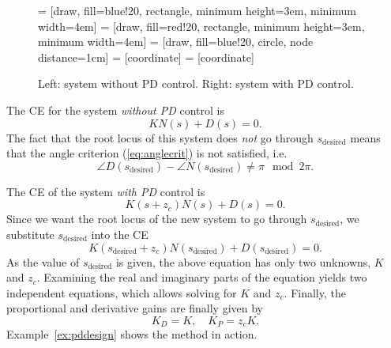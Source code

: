 \documentclass[a4paper,11pt]{report}
\theoremstyle{definition}
\newcommand{\des}{\textrm{desired}}
\begin{document}
\begin{figure}[H]
  \label{fig:pddesign}
  \centering
   = [draw, fill=blue!20, rectangle, minimum height=3em, minimum width=4em]
   = [draw, fill=red!20, rectangle, minimum height=3em, minimum width=4em]
   = [draw, fill=blue!20, circle, node distance=1cm]
   = [coordinate]
   = [coordinate]
  \hspace{0.5cm}
  \caption{Left: system without PD control. Right: system with PD control.}
\end{figure}

The CE for the system \emph{without PD} control is
\[
KN(s)+D(s) = 0.
\]
The fact that the root locus of this system does \emph{not} go through
$s_\des$ means that the angle criterion (\ref{eq:anglecrit}) is not
satisfied, i.e.
\[
\angle D(s_\des)-\angle N(s_\des) \neq \pi \mod 2\pi.
\]

The CE of the system \emph{with PD} control is
\[
K(s+z_c)N(s)+D(s) = 0.
\]
Since we want the root locus of the new system to go through $s_\des$,
we substitute $s_\des$ into the CE
\[
K(s_\des+z_c)N(s_\des)+D(s_\des) = 0.
\]
As the value of $s_\des$ is given, the above equation has only two
unknowns, $K$ and $z_c$. Examining the real and imaginary parts of the
equation yields two independent equations, which allows solving for
$K$ and $z_c$. Finally, the proportional and derivative gains are
finally given by
\[
K_D = K,\quad K_P = z_cK.
\]
Example~\ref{ex:pddesign} shows the method in action.
\end{document}
